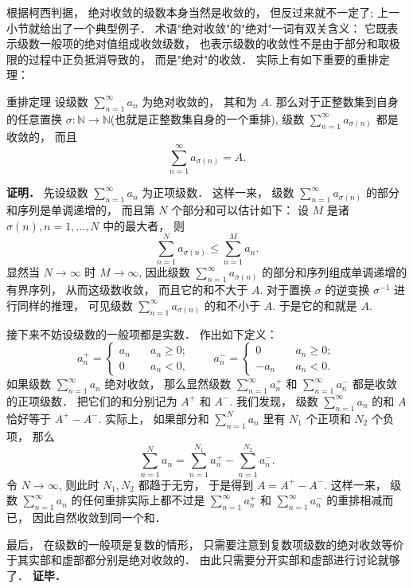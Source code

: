 根据柯西判据， 绝对收敛的级数本身当然是收敛的， 但反过来就不一定了; 上一小节就给出了一个典型例子． 术语"绝对收敛"的"绝对"一词有双关含义： 它既表示级数一般项的绝对值组成收敛级数， 也表示级数的收敛性不是由于部分和取极限的过程中正负抵消导致的， 而是"绝对"的收敛． 实际上有如下重要的重排定理：

\begin{theorem}{重排定理}
设级数 $\sum_{n=1}^\infty a_n$ 为绝对收敛的， 其和为 $A$. 那么对于正整数集到自身的任意置换 $\sigma:\mathbb{N}\to\mathbb{N}$(也就是正整数集自身的一个重排), 级数 $\sum_{n=1}^\infty a_{\sigma(n)}$ 都是收敛的， 而且
$$
\sum_{n=1}^\infty a_{\sigma(n)}=A.
$$
\end{theorem}

\textbf{证明．} 先设级数 $\sum_{n=1}^\infty a_n$ 为正项级数． 这样一来， 级数 $\sum_{n=1}^\infty a_{\sigma(n)}$ 的部分和序列是单调递增的， 而且第 $N$ 个部分和可以估计如下： 设 $M$ 是诸 $\sigma(n),n=1,...,N$ 中的最大者， 则
$$
\sum_{n=1}^Na_{\sigma(n)}\leq\sum_{n=1}^{M}a_n.
$$
显然当 $N\to\infty$ 时 $M\to\infty$, 因此级数 $\sum_{n=1}^\infty a_{\sigma(n)}$ 的部分和序列组成单调递增的有界序列， 从而这级数收敛， 而且它的和不大于 $A$. 对于置换 $\sigma$ 的逆变换 $\sigma^{-1}$ 进行同样的推理， 可见级数 $\sum_{n=1}^\infty a_{\sigma(n)}$ 的和不小于 $A$. 于是它的和就是 $A$.

接下来不妨设级数的一般项都是实数． 作出如下定义：
$$
a_n^+=\left\{\begin{array}{cc}
{a_n}\quad &a_n\geq0;\\
0\quad &a_n<0,
\end{array}\right.
\quad\quad
a_n^-=\left\{\begin{array}{cc}
0\quad &a_n\geq0;\\
-a_n\quad &a_n<0.
\end{array}\right.
$$
如果级数 $\sum_{n=1}^\infty a_n$ 绝对收敛， 那么显然级数 $\sum_{n=1}^\infty a_n^+$ 和 $\sum_{n=1}^\infty a_n^-$ 都是收敛的正项级数． 把它们的和分别记为 $A^+$ 和 $A^-$. 我们发现， 级数 $\sum_{n=1}^\infty a_n$ 的和 $A$ 恰好等于 $A^+-A^-$. 实际上， 如果部分和 $\sum_{n=1}^N a_n$ 里有 $N_1$ 个正项和 $N_2$ 个负项， 那么
$$
\sum_{n=1}^N a_n=\sum_{n=1}^{N_1} a_n^+-\sum_{n=1}^{N_2} a_n^-.
$$
令 $N\to\infty$, 则此时 $N_1,N_2$ 都趋于无穷， 于是得到 $A=A^+-A^-$. 这样一来， 级数 $\sum_{n=1}^\infty a_n$ 的任何重排实际上都不过是 $\sum_{n=1}^\infty a_n^+$ 和 $\sum_{n=1}^\infty a_n^-$ 的重排相减而已， 因此自然收敛到同一个和．

最后， 在级数的一般项是复数的情形， 只需要注意到复数项级数的绝对收敛等价于其实部和虚部都分别是绝对收敛的． 由此只需要分开实部和虚部进行讨论就够了． \textbf{证毕．}